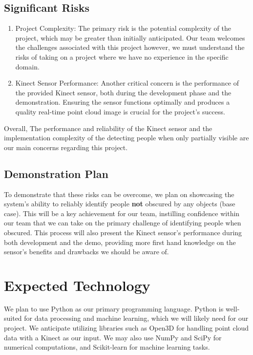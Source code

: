\documentclass{article}
\begin{document}
\subsection*{Significant Risks}
\begin{enumerate}
\item Project Complexity: The primary risk is the potential complexity of the project, which may be greater than initially anticipated. 
Our team welcomes the challenges associated with this project however, we must understand the risks of taking on a project where we have no experience in the specific domain.

\item Kinect Sensor Performance: Another critical concern is the performance of the provided Kinect sensor, both during the development phase and the demonstration. 
Ensuring the sensor functions optimally and produces a quality real-time point cloud image is crucial for the project's success.

\end{enumerate}

Overall, The performance and reliability of the Kinect sensor and the implementation complexity of the detecting people when only partially visible are our main concerns regarding this project.

\subsection*{Demonstration Plan}

To demonstrate that these risks can be overcome, we plan on showcasing the system's ability to reliably identify people \textbf{not} obscured by any objects (base case). 
This will be a key achievement for our team, instilling confidence within our team that we can take on the primary challenge of identifying people when obscured.
This process will also present the Kinect sensor's performance during both development and the demo, providing more first hand knowledge on the sensor's benefits and drawbacks we should be aware of.

\section{Expected Technology}

We plan to use Python as our primary programming language. 
Python is well-suited for data processing and machine learning, which we will likely need for our project.
We anticipate utilizing libraries such as Open3D for handling point cloud data with a Kinect as our input. 
We may also use NumPy and SciPy for numerical computations, and Scikit-learn for machine learning tasks.\\
\end{document}
